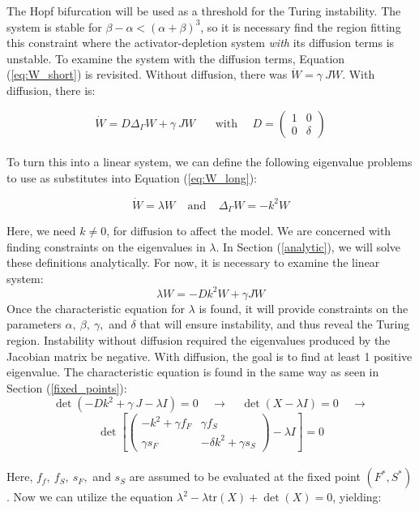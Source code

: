 \documentclass[12pt]{article}
\begin{document}
The Hopf bifurcation will be used as a threshold for the Turing instability. The system is stable for $\beta-\alpha < (\alpha+\beta)^3$, so it is necessary find the region fitting this constraint where the activator-depletion system {\it with} its diffusion terms is unstable. To examine the system with the diffusion terms, Equation (\ref{eq:W_short}) is revisited. Without diffusion, there was $\dot{W}=\gamma~JW$. With diffusion, there is:

\begin{equation}
\label{eq:W_long}
    \dot{W}=D\Delta_\Gamma W+\gamma~JW ~~~~~~~~\text{with}~~~~ ~~
    D=\left(\begin{matrix} 
    1 & 0 \\ 0 & \delta
    \end{matrix}\right)
\end{equation}
\\
\noindent To turn this into a linear system, we can define the following eigenvalue problems to use as substitutes into Equation (\ref{eq:W_long}):

\begin{equation}
\label{eq:sub}
    \dot{W}=\lambda W ~~~~~\text{and}~~~~~ \Delta_\Gamma W = -k^2W
\end{equation}

\pagebreak

\noindent Here, we need $k\neq0$, for diffusion to affect the model. We are concerned with finding constraints on the eigenvalues in $\lambda$. In Section (\ref{analytic}), we will solve these definitions analytically. For now, it is necessary to examine the linear system:
\begin{equation}
    \lambda W = -Dk^2 W+\gamma JW
\end{equation}
\noindend Once the characteristic equation for $\lambda$ is found, it will provide constraints on the parameters $\alpha, ~\beta, ~\gamma,$ and $\delta$ that will ensure instability, and thus reveal the Turing region. Instability without diffusion required the eigenvalues produced by the Jacobian matrix be negative. With diffusion, the goal is to find at least 1 positive eigenvalue. The characteristic equation is found in the same way as seen in Section (\ref{fixed_points}):
$$    \det(  - Dk^2 + \gamma~J-\lambda I ) = 0 ~~~~~ \longrightarrow ~~~~~  \det(X-\lambda I)=0 ~~~~~ \longrightarrow$$
\begin{equation}
    \label{linear}
    \det\left[\left(\begin{matrix}
        -k^2+\gamma f_F & \gamma f_S \\
        \gamma s_F & -\delta k^2 + \gamma s_S
        \end{matrix}\right)-\lambda I\right]=0
\end{equation}
\\
 \noindent Here, $f_f, ~f_S, ~s_F,$ and $s_S$ are assumed to be evaluated at the fixed point $(F^*,S^*)$. Now we can utilize the equation $\lambda^2-\lambda\text{tr}(X)+\det(X)=0$, yielding:
\end{document}
